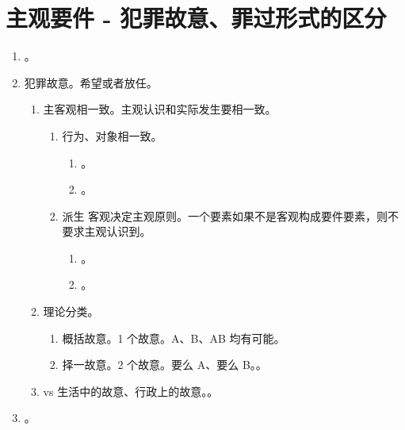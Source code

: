 \section{主观要件 - 犯罪故意、罪过形式的区分}
\begin{enumerate}
  \item {}。
  \item 犯罪故意。希望或者放任。
        \begin{enumerate}
          \item 主客观相一致。主观认识和实际发生要相一致。
                \begin{enumerate}
                  \item 行为、对象相一致。
                        \begin{enumerate}
                          \item {}。
                          \item {}。
                        \end{enumerate}
                  \item 派生 \yjt 客观决定主观原则。一个要素如果不是客观构成要件要素，则不要求主观认识到。
                        \begin{enumerate}
                          \item {}。
                          \item {}。
                        \end{enumerate}
                \end{enumerate}
          \item 理论分类。
                \begin{enumerate}
                  \item 概括故意。1 个故意。A、B、AB 均有可能。
                  \item 择一故意。2 个故意。要么 A、要么 B。。
                \end{enumerate}
          \item vs 生活中的故意、行政上的故意。。
        \end{enumerate}
  \item {}。

\end{enumerate}
